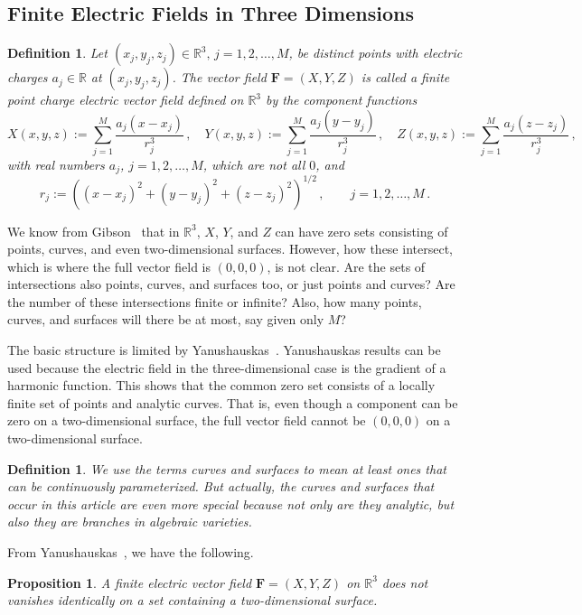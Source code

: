 \documentclass{article}
\newtheorem{prop}[thm]{Proposition}
\newtheorem{defn}[thm]{\bf Definition}
\theoremstyle{remark}
\numberwithin{equation}{section}
\begin{document}
\subsection{Finite Electric Fields in Three Dimensions}\label{GenThreeSpace}

\begin{defn}\label{FEF3}
Let $(x_j,y_j,z_j) \in {\mathbb R}^3,\,j=1,2,\ldots,M$, be distinct points with electric charges $a_j \in {\mathbb R}$ at $(x_j,y_j,z_j)$. The vector field ${\mathbf F}=(X,Y,Z)$ 
is called a finite point charge electric vector field defined on ${\mathbb R}^3$ by the component functions 
$$X(x,y,z) := \sum_{j=1}^M{\frac{a_j(x-x_j)}{r_j^3}}\,, \quad  Y(x,y,z) := \sum_{j=1}^M{\frac{a_j(y-y_j)}{r_j^3}}\,, \quad Z(x,y,z) := \sum_{j=1}^M\frac{a_j(z-z_j)}{r_j^3}\,,$$
with real numbers $a_j$, $j=1,2,\ldots,M$, which are not all $0$, and 
$$r_j := ((x-x_j)^2+ (y-y_j)^2 + (z-z_j)^2)^{1/2}\,, \qquad j=1,2, \dots,M\,.$$
\end{defn}

We know from Gibson~\cite{Gibson} that in ${\mathbb R}^3$, $X$, $Y$, and $Z$ can have zero sets consisting of points, curves, and even two-dimensional surfaces. 
However, how these intersect, which is where the full vector field is $(0,0,0)$, is not clear.  Are the sets of intersections also points, curves, and surfaces too, or just 
points and curves? Are the number of these intersections finite or infinite?  Also, how many points, curves, and surfaces will there be at most, say given only $M$?  

The basic structure is limited by Yanushauskas~\cite{Jan}. Yanushauskas results can be used because the electric field in the three-dimensional case is the gradient of a 
harmonic function. This shows that the common zero set consists of a locally finite set of points and analytic curves.  That is, even though a component can be zero on a 
two-dimensional surface, the full vector field cannot be $(0,0,0)$ on a two-dimensional surface.  

\begin{defn}  We use the terms curves and surfaces to mean at least ones that can be continuously parameterized. But actually, the curves and surfaces that occur in this 
article are even more special because not only are they analytic, but also they are branches in algebraic varieties.
\end{defn}

From Yanushauskas~\cite{Jan}, we have the following.

\begin{prop}\label{Yanush} A finite electric vector field ${\mathbf F}=(X,Y,Z)$ on ${\mathbb R}^3$ does not vanishes identically on a set containing a 
two-dimensional surface.
\end{prop}
\end{document}
